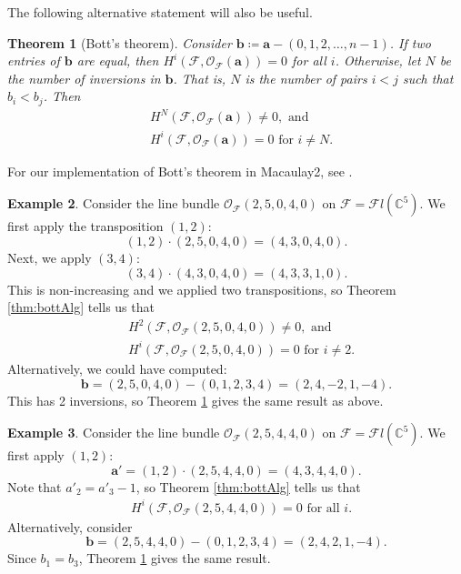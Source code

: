 \documentclass[12pt,reqno]{amsart}
\newtheorem{theorem}{Theorem}[section]
\theoremstyle{definition}
\newtheorem{example}[theorem]{Example}
\theoremstyle{remark}
\newcommand{\calF}{{\mathcal{F}}}
\newcommand{\calO}{{\mathcal{O}}}
\begin{document}
The following alternative statement will also be useful.

\begin{theorem}[Bott's theorem]\label{thm:bottAlternative}
    Consider $\mathbf b \coloneqq \mathbf a - (0,1,2,\ldots,n-1)$.  If two entries of $\mathbf b$ are equal, then $H^i(\calF,\calO_{\calF}(\mathbf a)) = 0 $ for all $i$.  Otherwise, let $N$ be the number of inversions in $\mathbf b$.  That is, $N$ is the number of pairs $i<j$ such that $b_i<b_j$.  Then
    \begin{align*}
    &H^N(\calF,\calO_{\calF}(\mathbf a)) \neq 0, \text{ and } \\
    &H^i(\calF,\calO_{\calF}(\mathbf a)) = 0 \text{ for } i\neq N.
    \end{align*}
\end{theorem}

For our implementation of Bott's theorem in Macaulay2, see \cite{githubRepo}.

\begin{example}
\label{ex:bott}
    Consider the line bundle $\calO_{\calF}(2,5,0,4,0)$ on $\calF = \calF l(\mathbb C^5)$. We first apply the transposition $(1,2)$:
    \[
    (1,2)\cdot (2,5,0,4,0) = (4,3,0,4,0).
    \]
    Next, we apply $(3,4)$:
    \[
    (3,4)\cdot (4,3,0,4,0) = (4,3,3,1,0).
    \]
    This is non-increasing and we applied two transpositions, so 
Theorem \ref{thm:bottAlg} tells us that
    \begin{align*}
    & H^2(\calF, \calO_{\calF}(2,5,0,4,0)) \neq 0, \text{ and }\\
    & H^i(\calF, \calO_{\calF}(2,5,0,4,0)) = 0 \text{ for } i \neq 2.
    \end{align*}
    Alternatively, we could have computed:
    \[
    \mathbf b = (2,5,0,4,0) - (0,1,2,3,4) = (2,4,-2,1,-4).
    \]
    This has 2 inversions, so Theorem \ref{thm:bottAlternative} gives the same result as above.
\end{example}

\begin{example}
\label{ex:bott2}
    Consider the line bundle $\calO_{\calF}(2,5,4,4,0)$ on $\calF = \calF l(\mathbb C^5)$. We first apply $(1,2)$:
    \[
    \mathbf a' = (1,2)\cdot (2,5,4,4,0) = (4,3,4,4,0).
    \]
    Note that $a'_2 = a'_3-1$, so 
    Theorem \ref{thm:bottAlg} tells us that
    \begin{align*}
    & H^i(\calF, \calO_{\calF}(2,5,4,4,0)) = 0 \text{ for all } i.
    \end{align*}
    Alternatively, consider
    \[
    \mathbf b = (2,5,4,4,0) - (0,1,2,3,4) = (2,4,2,1,-4).
    \]
    Since $b_1 = b_3$, Theorem \ref{thm:bottAlternative} gives the same result.
\end{example}
\end{document}
